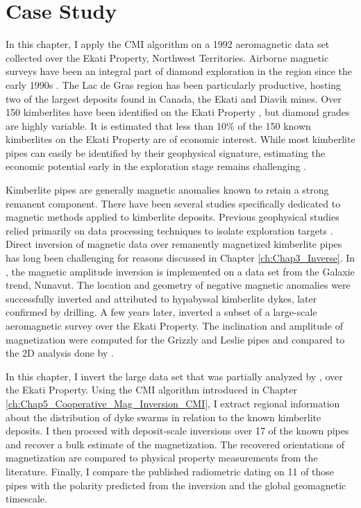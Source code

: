 \graphicspath{{./Figures/}}
\chapter{Case Study}
\label{ch:Chap6_Case_Study}

In this chapter, I apply the CMI algorithm on a 1992 aeromagnetic data set collected over the Ekati Property, Northwest Territories.
Airborne magnetic surveys have been an integral part of diamond exploration in the region since the early 1990s \cite[]{Pell1997}.
The Lac de Gras region has been particularly productive, hosting two of the largest deposits found in Canada, the Ekati and Diavik mines.
Over 150 kimberlites have been identified on the Ekati Property \cite[]{Carlson2015}, but diamond grades are highly variable.
It is estimated that less than 10$\%$ of the 150 known kimberlites on the Ekati Property are of economic interest.
While most kimberlite pipes can easily be identified by their geophysical signature, estimating the economic potential early in the exploration stage remains challenging \cite[]{CoopersmithEtAl2006}.

Kimberlite pipes are generally magnetic anomalies known to retain a strong remanent component.
There have been several studies specifically dedicated to magnetic methods applied to kimberlite deposits.
Previous geophysical studies relied primarily on data processing techniques to isolate exploration targets \cite[]{Cowan2000}.
Direct inversion of magnetic data over remanently magnetized kimberlite pipes has long been challenging for reasons discussed in Chapter \ref{ch:Chap3_Inverse}.
In \cite{Shearer05}, the magnetic amplitude inversion is implemented on a data set from the Galaxie trend, Nunavut.
The location and geometry of negative magnetic anomalies were successfully inverted and attributed to hypabyssal kimberlite dykes, later confirmed by drilling.
A few years later, \cite{Zhao2012} inverted a subset of a large-scale aeromagnetic survey over the Ekati Property.
The inclination and amplitude of magnetization were computed for the Grizzly and Leslie pipes and compared to the 2D analysis done by \cite{Cheman2006}.

In this chapter, I invert the large data set that was partially analyzed by \cite{Zhao2012}, over the Ekati Property.
Using the CMI algorithm introduced in Chapter \ref{ch:Chap5_Cooperative_Mag_Inversion_CMI}, I extract regional information about the distribution of dyke swarms in relation to the known kimberlite deposits.
I then proceed with deposit-scale inversions over 17 of the known pipes and recover a bulk estimate of the magnetization. The recovered orientations of magnetization are compared to physical property measurements from the literature.
Finally, I compare the published radiometric dating on 11 of those pipes with the polarity predicted from the inversion and the global geomagnetic timescale. 



